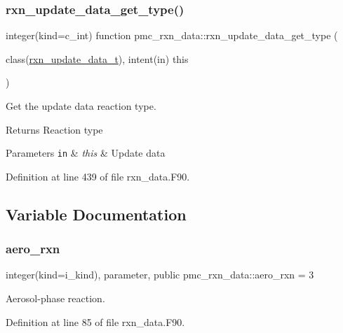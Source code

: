 \subsubsection{\texorpdfstring{rxn\+\_\+update\+\_\+data\+\_\+get\+\_\+type()}{rxn\_update\_data\_get\_type()}}
{\footnotesize\ttfamily integer(kind=c\+\_\+int) function pmc\+\_\+rxn\+\_\+data\+::rxn\+\_\+update\+\_\+data\+\_\+get\+\_\+type (\begin{DoxyParamCaption}\item[{class(\mbox{\hyperlink{structpmc__rxn__data_1_1rxn__update__data__t}{rxn\+\_\+update\+\_\+data\+\_\+t}}), intent(in)}]{this }\end{DoxyParamCaption})\hspace{0.3cm}{\ttfamily [private]}}



Get the update data reaction type. 

\begin{DoxyReturn}{Returns}
Reaction type
\end{DoxyReturn}

\begin{DoxyParams}[1]{Parameters}
\mbox{\tt in}  & {\em this} & Update data \\
\hline
\end{DoxyParams}


Definition at line 439 of file rxn\+\_\+data.\+F90.



\subsection{Variable Documentation}
\mbox{\label{namespacepmc__rxn__data_a5f312af427a9f94444065a1fb53289ce}} 
\subsubsection{\texorpdfstring{aero\+\_\+rxn}{aero\_rxn}}
{\footnotesize\ttfamily integer(kind=i\+\_\+kind), parameter, public pmc\+\_\+rxn\+\_\+data\+::aero\+\_\+rxn = 3}



Aerosol-\/phase reaction. 



Definition at line 85 of file rxn\+\_\+data.\+F90.

